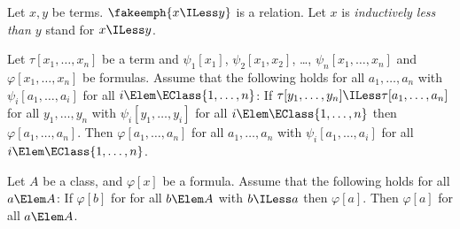 \documentclass{stex}
\begin{document}
\begin{sparagraph}[style=symdoc,for=ILess]
  \begin{signature*}
    Let $x, y$ be terms.
    $\fakeemph{x \ILess y}$ is a relation.
    Let $x$ is \emph{inductively less than $y$} stand for $x \ILess y$.
  \end{signature*}

  \begin{axiom*}
    Let $\tau[x_1, \dots, x_n]$ be a term and
    $\psi_1[x_1]$, $\psi_2[x_1,x_2]$, \dots, $\psi_n[x_1, \dots, x_n]$ and $\varphi[x_1, \dots, x_n]$ be formulas.
    Assume that the following holds for all $a_1, \dots, a_n$ with $\psi_i[a_1, \dots, a_i]$ for all $i \Elem \EClass{1, \dots, n}$:
    If $\tau[y_1, \dots, y_n] \ILess \tau[a_1, \dots, a_n]$
    for all $y_1, \dots, y_n$ with $\psi_i[y_1, \dots, y_i]$ for all $i \Elem \EClass{1, \dots, n}$
    then $\varphi[a_1, \dots, a_n]$.
    Then $\varphi[a_1, \dots, a_n]$ for all $a_1, \dots, a_n$ with $\psi_i[a_1, \dots, a_i]$ for all $i \Elem \EClass{1, \dots, n}$.
  \end{axiom*}

  \begin{proposition*}
    Let $A$ be a class, and $\varphi[x]$ be a formula.
    Assume that the following holds for all $a \Elem A$:
    If $\varphi[b]$ for for all $b \Elem A$ with $b \ILess a$ then $\varphi[a]$.
    Then $\varphi[a]$ for all $a \Elem A$.
  \end{proposition*}
\end{sparagraph}


\ifinputref\else{}\fi
\end{document}
